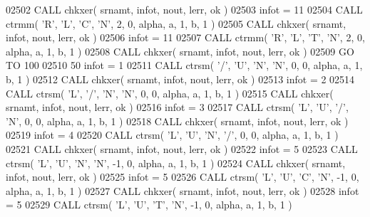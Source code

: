 \begin{DoxyCode}
02502       \textcolor{keyword}{CALL }chkxer( srnamt, infot, nout, lerr, ok )
02503       infot = 11
02504       \textcolor{keyword}{CALL }ctrmm( \textcolor{stringliteral}{'R'}, \textcolor{stringliteral}{'L'}, \textcolor{stringliteral}{'C'}, \textcolor{stringliteral}{'N'}, 2, 0, alpha, a, 1, b, 1 )
02505       \textcolor{keyword}{CALL }chkxer( srnamt, infot, nout, lerr, ok )
02506       infot = 11
02507       \textcolor{keyword}{CALL }ctrmm( \textcolor{stringliteral}{'R'}, \textcolor{stringliteral}{'L'}, \textcolor{stringliteral}{'T'}, \textcolor{stringliteral}{'N'}, 2, 0, alpha, a, 1, b, 1 )
02508       \textcolor{keyword}{CALL }chkxer( srnamt, infot, nout, lerr, ok )
02509       \textcolor{keywordflow}{GO TO} 100
02510    50 infot = 1
02511       \textcolor{keyword}{CALL }ctrsm( \textcolor{stringliteral}{'/'}, \textcolor{stringliteral}{'U'}, \textcolor{stringliteral}{'N'}, \textcolor{stringliteral}{'N'}, 0, 0, alpha, a, 1, b, 1 )
02512       \textcolor{keyword}{CALL }chkxer( srnamt, infot, nout, lerr, ok )
02513       infot = 2
02514       \textcolor{keyword}{CALL }ctrsm( \textcolor{stringliteral}{'L'}, \textcolor{stringliteral}{'/'}, \textcolor{stringliteral}{'N'}, \textcolor{stringliteral}{'N'}, 0, 0, alpha, a, 1, b, 1 )
02515       \textcolor{keyword}{CALL }chkxer( srnamt, infot, nout, lerr, ok )
02516       infot = 3
02517       \textcolor{keyword}{CALL }ctrsm( \textcolor{stringliteral}{'L'}, \textcolor{stringliteral}{'U'}, \textcolor{stringliteral}{'/'}, \textcolor{stringliteral}{'N'}, 0, 0, alpha, a, 1, b, 1 )
02518       \textcolor{keyword}{CALL }chkxer( srnamt, infot, nout, lerr, ok )
02519       infot = 4
02520       \textcolor{keyword}{CALL }ctrsm( \textcolor{stringliteral}{'L'}, \textcolor{stringliteral}{'U'}, \textcolor{stringliteral}{'N'}, \textcolor{stringliteral}{'/'}, 0, 0, alpha, a, 1, b, 1 )
02521       \textcolor{keyword}{CALL }chkxer( srnamt, infot, nout, lerr, ok )
02522       infot = 5
02523       \textcolor{keyword}{CALL }ctrsm( \textcolor{stringliteral}{'L'}, \textcolor{stringliteral}{'U'}, \textcolor{stringliteral}{'N'}, \textcolor{stringliteral}{'N'}, -1, 0, alpha, a, 1, b, 1 )
02524       \textcolor{keyword}{CALL }chkxer( srnamt, infot, nout, lerr, ok )
02525       infot = 5
02526       \textcolor{keyword}{CALL }ctrsm( \textcolor{stringliteral}{'L'}, \textcolor{stringliteral}{'U'}, \textcolor{stringliteral}{'C'}, \textcolor{stringliteral}{'N'}, -1, 0, alpha, a, 1, b, 1 )
02527       \textcolor{keyword}{CALL }chkxer( srnamt, infot, nout, lerr, ok )
02528       infot = 5
02529       \textcolor{keyword}{CALL }ctrsm( \textcolor{stringliteral}{'L'}, \textcolor{stringliteral}{'U'}, \textcolor{stringliteral}{'T'}, \textcolor{stringliteral}{'N'}, -1, 0, alpha, a, 1, b, 1 )

\end{DoxyCode}
